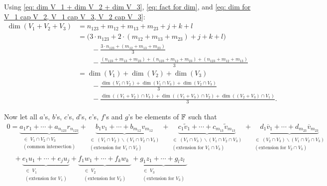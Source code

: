 \begin{failedattempt}
  Using \eqref{eq: dim V_1 + dim V_2 + dim V_3}, \eqref{eq: fact for dim}, and \eqref{eq: dim for V_1 cap V_2, V_1 cap V_3, V_2 cap V_3}:
  \[
  \begin{aligned}
    \dim (V_1 + V_2 + V_3) & = n_{123} + m_{12} + m_{13} + m_{23} + j + k + l \\
    & = \Big(3 \cdot n_{123} + 2 \cdot (m_{12}+m_{13}+m_{23})+j+k+l \Big) \\
    & \qquad - \frac{3 \cdot n_{123}+(m_{12}+m_{13}+m_{23}) }{3} \\
    & \qquad - \frac{(n_{123} + m_{13} + m_{23})+(n_{123} + m_{12} + m_{23})+(n_{123} + m_{12} + m_{13})}{3} \\
    & = \dim (V_1) + \dim (V_2) + \dim (V_3) \\
    & \qquad - \frac{\dim (V_1 \cap V_2) + \dim (V_1 \cap V_3) + \dim (V_2 \cap V_3)}{3} \\
    & \qquad - \frac{ \dim \left(  (V_1 + V_2) \cap V_3 \right) + \dim \left( (V_1 + V_3) \cap V_2 \right)+ \dim \left( (V_2 + V_3) \cap V_1 \right) }{3}.
  \end{aligned}
  \]

  Now let all $a$'s, $b$'s, $c$'s, $d$'s, $e$'s, $f$'s and $g$'s be elements of $\mathbb{F}$ such that
  \begin{equation}
    \label{eq: linear independence formula}
    \begin{aligned}
    0 = \underbrace{a_1r_1 + \cdots + a_{n_{123}} r_{n_{123}}}_{\substack{\in \; V_1 \cap V_2 \cap V_3 \\ (\text{common intersection})}}
    + \underbrace{b_1v_1 + \cdots + b_{m_{12}} v_{m_{12}}}_{
        \substack{\in \; (V_1 \cap V_2) \backslash (V_1 \cap V_2 \cap V_3) \\ (\text{extension for } V_1 \cap V_2)}}
    + \underbrace{c_1\widetilde{v}_1 + \cdots + c_{m_{13}}\widetilde{v}_{m_{13}}}_{
        \substack{\in \; (V_1 \cap V_3) \backslash (V_1 \cap V_2 \cap V_3) \\ (\text{extension for } V_1 \cap V_3)}}
    + \underbrace{d_1\overline{v}_1 + \cdots + d_{m_{23}}\overline{v}_{m_{23}}}_{
        \substack{\in \; (V_2 \cap V_3) \backslash (V_1 \cap V_2 \cap V_3) \\ (\text{extension for } V_2 \cap V_3)}} \\
    \quad
    + \underbrace{e_1 u_1 + \cdots + e_j u_j}_{
      \substack{\in \; V_1 \\ (\text{extension for } V_1)}}
    + \underbrace{f_1 w_1 + \cdots + f_k w_k \phantom{_j}\!\!\!}_{
      \substack{\in \; V_2 \\ (\text{extension for } V_2)}}
    + \underbrace{g_1 z_1 + \cdots + g_l z_l \phantom{_j}\!\!\!}_{
      \substack{\in \; V_3 \\ (\text{extension for } V_3)}}
    \end{aligned}
  \end{equation}


\end{failedattempt}
